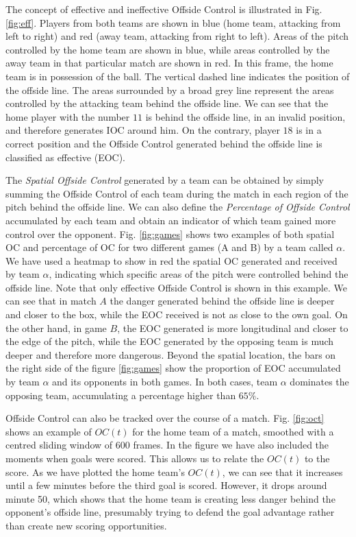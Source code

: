 \documentclass[
  10pt,
  twoside,nohyper]{book}
\begin{document}
The concept of effective and ineffective Offside Control is illustrated in Fig. \ref{fig:eff}. Players from both teams are shown in blue (home team, attacking from left to right) and red (away team, attacking from right to left). Areas of the pitch controlled by the home team are shown in blue, while areas controlled by the away team in that particular match are shown in red. In this frame, the home team is in possession of the ball. The vertical dashed line indicates the position of the offside line. The areas surrounded by a broad grey line represent the areas controlled by the attacking team behind the offside line. We can see that the home player with the number \(11\) is behind the offside line, in an invalid position, and therefore generates IOC around him. On the contrary, player \(18\) is in a correct position and the Offside Control generated behind the offside line is classified as effective (EOC).

The \emph{Spatial Offside Control} generated by a team can be obtained by simply summing the Offside Control of each team during the match in each region of the pitch behind the offside line. We can also define the \emph{Percentage of Offside Control} accumulated by each team and obtain an indicator of which team gained more control over the opponent. Fig. \ref{fig:games} shows two examples of both spatial OC and percentage of OC for two different games (A and B) by a team called \(\alpha\). We have used a heatmap to show in red the spatial OC generated and received by team \(\alpha\), indicating which specific areas of the pitch were controlled behind the offside line. Note that only effective Offside Control is shown in this example. We can see that in match \(A\) the danger generated behind the offside line is deeper and closer to the box, while the EOC received is not as close to the own goal. On the other hand, in game \(B\), the EOC generated is more longitudinal and closer to the edge of the pitch, while the EOC generated by the opposing team is much deeper and therefore more dangerous. Beyond the spatial location, the bars on the right side of the figure \ref{fig:games} show the proportion of EOC accumulated by team \(\alpha\) and its opponents in both games. In both cases, team \(\alpha\) dominates the opposing team, accumulating a percentage higher than \(65\%\).

Offside Control can also be tracked over the course of a match. Fig. \ref{fig:oct} shows an example of \(OC(t)\) for the home team of a match, smoothed with a centred sliding window of 600 frames. In the figure we have also included the moments when goals were scored. This allows us to relate the \(OC(t)\) to the score. As we have plotted the home team's \(OC(t)\), we can see that it increases until a few minutes before the third goal is scored. However, it drops around minute 50, which shows that the home team is creating less danger behind the opponent's offside line, presumably trying to defend the goal advantage rather than create new scoring opportunities.
\end{document}
